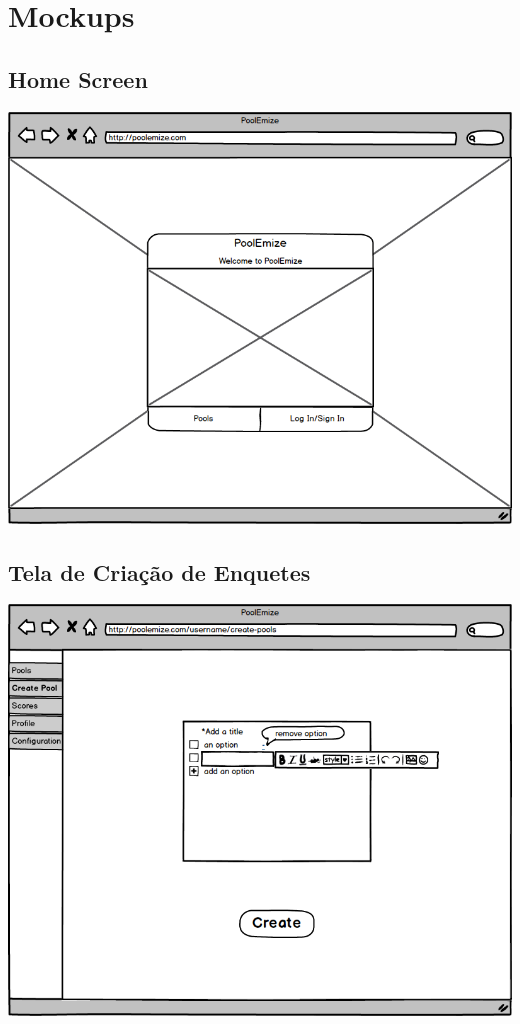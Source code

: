 \documentclass[a4paper,12pt]{article}
\begin{document}
\newpage
\section*{Mockups}
\markright{}
\subsection*{Home Screen}
\markright{}
\includegraphics[width=15cm]{mockups/HomeScreen.png}
\subsection*{Tela de Criação de Enquetes}
\markright{}
\includegraphics[width=15cm]{mockups/CreatePoollsTab.png}
\end{document}
